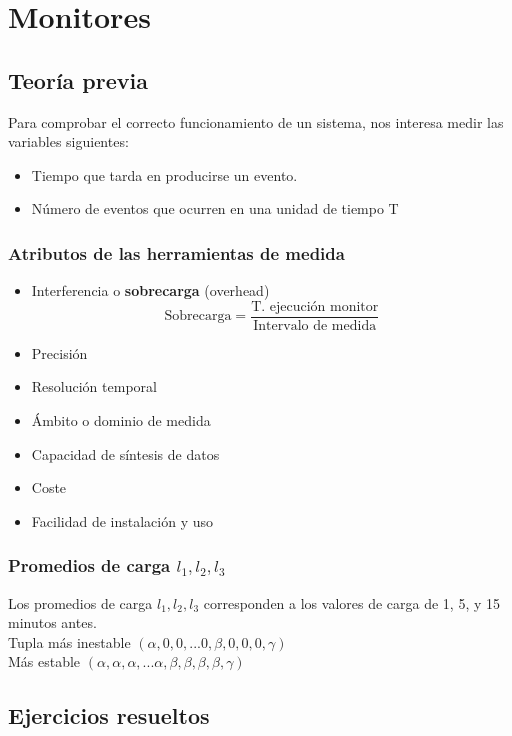 \chapter{Monitores}

\section{Teoría previa}
Para comprobar el correcto funcionamiento de un sistema, nos interesa medir las variables siguientes:
\begin{itemize}
    \item Tiempo que tarda en producirse un evento.
    \item Número de eventos que ocurren en una unidad de tiempo T
\end{itemize}
\subsection{Atributos de las herramientas de medida}
\begin{itemize}
    \item Interferencia o \textbf{sobrecarga} (overhead)
    \[
    \text{Sobrecarga} = \dfrac{\text{T. ejecución monitor}}{\text{Intervalo de medida}}
    \]
    \item Precisión
    \item Resolución temporal
    \item Ámbito o dominio de medida
    \item Capacidad de síntesis de datos
    \item Coste
    \item Facilidad de instalación y uso
\end{itemize}
\subsection{Promedios de carga $l_1, l_2, l_3$}
Los promedios de carga $l_1, l_2, l_3$ corresponden a los valores de carga de 1, 5, y 15 minutos antes.\\

Tupla más inestable $(\alpha,0,0,...0,\beta,0,0,0,\gamma)$\\
Más estable $(\alpha,\alpha,\alpha,...\alpha,\beta,\beta,\beta,\beta,\gamma)$
\newpage
\section{Ejercicios resueltos}
